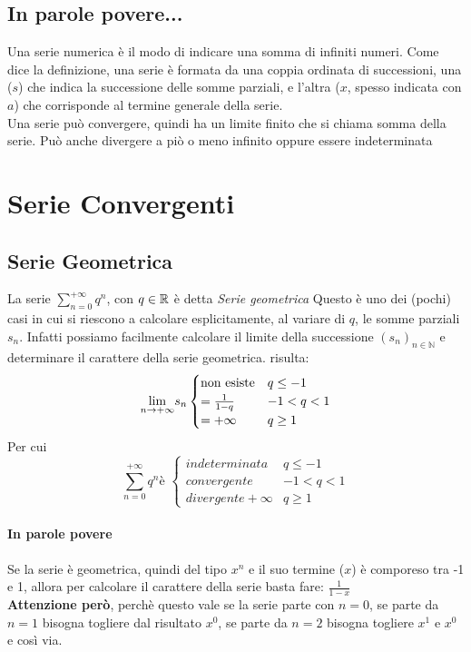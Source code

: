 \documentclass[12pt, a4paper, openany]{book}
\begin{document}
\subsection*{In parole povere...}
Una serie numerica è il modo di indicare una somma di infiniti numeri.
Come dice la definizione, una serie è formata da una coppia ordinata di successioni, una ($s$) che indica la successione delle somme parziali, e l'altra ($x$, spesso indicata con $a$) che corrisponde al termine generale della serie.
\\Una serie può convergere, quindi ha un limite finito che si chiama somma della serie. Può anche divergere a piò o meno infinito oppure essere indeterminata


\section{Serie Convergenti}
\subsection{Serie Geometrica}
La serie $\sum_{n=0}^{+\infty} q^n$, con $q \in \mathbb{R}$ è detta \emph{Serie geometrica}
Questo è uno dei (pochi) casi in cui si riescono a calcolare esplicitamente, al variare di $q$, le somme parziali $s_n$.
Infatti possiamo facilmente calcolare il limite della successione $(s_n)_{n\in \mathbb{N}}$ e determinare il carattere della serie geometrica.
risulta:
\begin{equation}
	\underset{n \to +\infty}{\lim} s_n \begin{cases}
		\text{non esiste} & q \leq -1  \\
		= \frac{1}{1-q}   & -1 < q < 1 \\
		= +\infty         & q \geq 1
	\end{cases}
\end{equation}
Per cui
\begin{equation}
	\sum_{n=0}^{+\infty} q^n \text{è } \begin{cases}
		indeterminata      & q \leq -1  \\
		convergente        & -1 < q < 1 \\
		divergente +\infty & q \geq 1
	\end{cases}
\end{equation}


\paragraph{In parole povere}
Se la serie è geometrica, quindi del tipo $x^n$ e il suo termine ($x$) è comporeso tra -1 e 1, allora per calcolare il carattere della serie basta fare: $\frac{1}{1-x}$
\\ \textbf{Attenzione però}, perchè questo vale se la serie parte con $n=0$, se parte da $n=1$ bisogna togliere dal risultato $x^0$, se parte da $n=2$ bisogna togliere $x^1$ e $x^0$ e così via.
\end{document}
